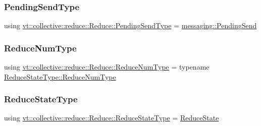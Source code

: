 \subsubsection{\texorpdfstring{Pending\+Send\+Type}{PendingSendType}}
{\footnotesize\ttfamily using \hyperlink{structvt_1_1collective_1_1reduce_1_1_reduce_a0474b491f3c93014d9a0ce0356c6bfd5}{vt\+::collective\+::reduce\+::\+Reduce\+::\+Pending\+Send\+Type} =  \hyperlink{structvt_1_1messaging_1_1_pending_send}{messaging\+::\+Pending\+Send}}

\mbox{\label{structvt_1_1collective_1_1reduce_1_1_reduce_a6c3e63aca10c31d2823b0b18cf9762a4}} 
\subsubsection{\texorpdfstring{Reduce\+Num\+Type}{ReduceNumType}}
{\footnotesize\ttfamily using \hyperlink{structvt_1_1collective_1_1reduce_1_1_reduce_a6c3e63aca10c31d2823b0b18cf9762a4}{vt\+::collective\+::reduce\+::\+Reduce\+::\+Reduce\+Num\+Type} =  typename \hyperlink{structvt_1_1collective_1_1reduce_1_1_reduce_state_ae83d217c90b8a8895ca998d7ea9c49e4}{Reduce\+State\+Type\+::\+Reduce\+Num\+Type}}

\mbox{\label{structvt_1_1collective_1_1reduce_1_1_reduce_ab0e89b962f0741718107772505fe6d34}} 
\subsubsection{\texorpdfstring{Reduce\+State\+Type}{ReduceStateType}}
{\footnotesize\ttfamily using \hyperlink{structvt_1_1collective_1_1reduce_1_1_reduce_ab0e89b962f0741718107772505fe6d34}{vt\+::collective\+::reduce\+::\+Reduce\+::\+Reduce\+State\+Type} =  \hyperlink{structvt_1_1collective_1_1reduce_1_1_reduce_state}{Reduce\+State}}



